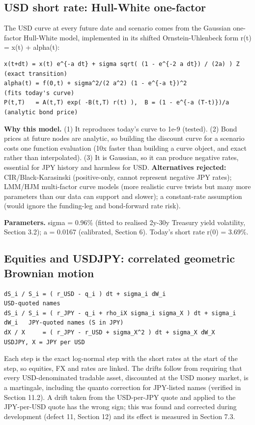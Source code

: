 \documentclass[11pt,letterpaper]{article}
\begin{document}
\subsection{USD short rate: Hull-White one-factor}
The USD curve at every future date and scenario comes from the Gaussian one-factor Hull-White model, implemented in its shifted Ornstein-Uhlenbeck form r(t) = x(t) + alpha(t):

{\fontsize{7.2}{8.8}\selectfont
\begin{verbatim}
x(t+dt) = x(t) e^{-a dt} + sigma sqrt( (1 - e^{-2 a dt}) / (2a) ) Z      (exact transition)
alpha(t) = f(0,t) + sigma^2/(2 a^2) (1 - e^{-a t})^2                      (fits today's curve)
P(t,T)   = A(t,T) exp( -B(t,T) r(t) ),  B = (1 - e^{-a (T-t)})/a        (analytic bond price)
\end{verbatim}}
\textbf{Why this model.} (1) It reproduces today's curve to 1e-9 (tested). (2) Bond prices at future nodes are analytic, so building the discount curve for a scenario costs one function evaluation (10x faster than building a curve object, and exact rather than interpolated). (3) It is Gaussian, so it can produce negative rates, essential for JPY history and harmless for USD. \textbf{Alternatives rejected:} CIR/Black-Karasinski (positive-only, cannot represent negative JPY rates); LMM/HJM multi-factor curve models (more realistic curve twists but many more parameters than our data can support and slower); a constant-rate assumption (would ignore the funding-leg and bond-forward rate risk).

\textbf{Parameters.} sigma = 0.96\% (fitted to realised 2y-30y Treasury yield volatility, Section 3.2); a = 0.0167 (calibrated, Section 6). Today's short rate r(0) = 3.69\%.

\subsection{Equities and USDJPY: correlated geometric Brownian motion}
{\fontsize{7.2}{8.8}\selectfont
\begin{verbatim}
dS_i / S_i = ( r_USD - q_i ) dt + sigma_i dW_i                         USD-quoted names
dS_i / S_i = ( r_JPY - q_i + rho_iX sigma_i sigma_X ) dt + sigma_i dW_i   JPY-quoted names (S in JPY)
dX / X     = ( r_JPY - r_USD + sigma_X^2 ) dt + sigma_X dW_X             USDJPY, X = JPY per USD
\end{verbatim}}
Each step is the exact log-normal step with the short rates at the start of the step, so equities, FX and rates are linked. The drifts follow from requiring that every USD-denominated tradable asset, discounted at the USD money market, is a martingale, including the quanto correction for JPY-listed names (verified in Section 11.2). A drift taken from the USD-per-JPY quote and applied to the JPY-per-USD quote has the wrong sign; this was found and corrected during development (defect 11, Section 12) and its effect is measured in Section 7.3.
\end{document}
